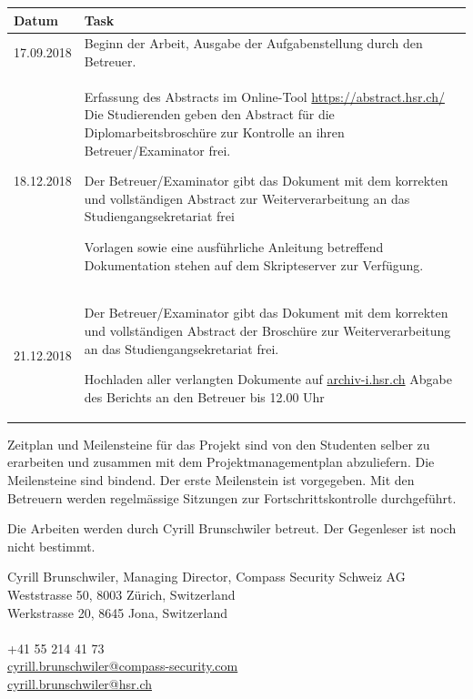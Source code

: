 \begin{table}[H]
    \centering
    \begin{tabular}{| p{2.5cm} | p{13.5cm} |}\hline
        \textbf{Datum} & \textbf{Task}  \\ \hline
        17.09.2018 & Beginn der Arbeit, Ausgabe der Aufgabenstellung durch den Betreuer. \\ \hline  
        18.12.2018 & Erfassung des Abstracts im Online-Tool \url{https://abstract.hsr.ch/} Die Studierenden geben den Abstract für die Diplomarbeitsbroschüre zur Kontrolle an ihren Betreuer/Examinator frei.  
        \par\vspace{4mm}
        Der Betreuer/Examinator gibt das Dokument mit dem korrekten und vollständigen Abstract zur Weiterverarbeitung an das Studiengangsekretariat frei 
        \par\vspace{4mm}
        Vorlagen sowie eine ausführliche Anleitung betreffend Dokumentation stehen auf dem Skripteserver zur Verfügung.\\ \hline  
        21.12.2018 & Der Betreuer/Examinator gibt das Dokument mit dem korrekten und vollständigen Abstract der Broschüre zur Weiterverarbeitung an das Studiengangsekretariat frei.
        \par\vspace{4mm}
        Hochladen aller verlangten Dokumente auf \url{archiv-i.hsr.ch} Abgabe des Berichts an den Betreuer bis 12.00 Uhr \\ \hline      
    \end{tabular}
\end{table}

Zeitplan und Meilensteine für das Projekt sind von den Studenten selber zu erarbeiten und zusammen mit dem Projektmanagementplan abzuliefern. Die Meilensteine sind bindend. Der erste Meilenstein ist vorgegeben. Mit den Betreuern werden regelmässige Sitzungen zur Fortschrittskontrolle durchgeführt.

Die Arbeiten werden durch Cyrill Brunschwiler betreut. Der Gegenleser ist noch nicht bestimmt.

Cyrill Brunschwiler, Managing Director, Compass Security Schweiz AG\\
Weststrasse 50, 8003 Zürich, Switzerland\\
Werkstrasse 20, 8645 Jona, Switzerland
\\\\
+41 55 214 41 73 \ \\
\href{mailto:cyrill.brunschwiler@compass-security.com}{cyrill.brunschwiler@compass-security.com}\ \\
\href{mailto:cyrill.brunschwiler@hsr.ch }{cyrill.brunschwiler@hsr.ch} \ \\

